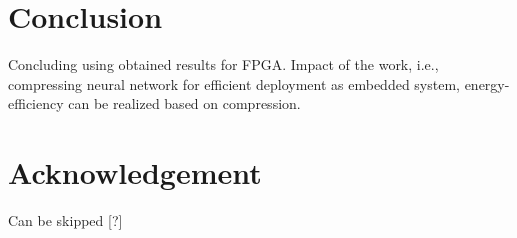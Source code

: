 \documentclass[conference]{IEEEtran}
\begin{document}
\section{Conclusion} \label{sec:conclusion}

Concluding using obtained results for FPGA. Impact of the work, i.e., compressing neural network for efficient deployment as embedded system, energy-efficiency can be realized based on compression. 

\section{Acknowledgement}

Can be skipped [?]





\newpage



\end{document}
